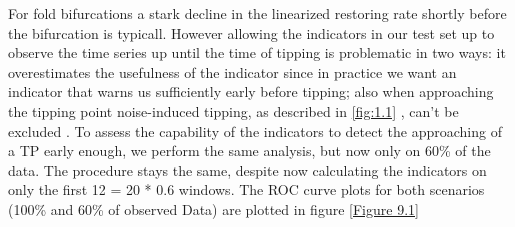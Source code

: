 \documentclass[%
thesis=student,%
coverpage=false,%
titlepage=false,%
headmarks=true, %
german,%
font=libertine, %
math=newpxtx, %
BCOR=5mm,%
coverBCOR=11mm%
]{tumbook}
\begin{document}
For fold bifurcations a stark decline in the linearized restoring rate shortly before the bifurcation is typicall. However allowing the indicators in our test set up to observe the time series up until the time of tipping is problematic in two ways: it overestimates the usefulness of the indicator since in practice we want an indicator that warns us sufficiently early before tipping; also when approaching the tipping point noise-induced tipping, as described in \ref{fig:1.1} , can't be excluded \cite{Ashwin:2012,Meng:2020}. To assess the capability of the indicators to detect the approaching of a TP early enough, we perform the same analysis, but now only on 60\% of the data. The procedure stays the same, despite now calculating the indicators on only the first 12 = 20 * 0.6 windows. The ROC curve plots for both scenarios (100\% and 60\% of observed Data) are plotted in figure \ref{Figure 9.1}
\end{document}
